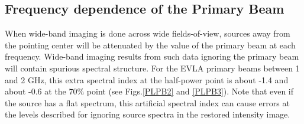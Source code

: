 \documentclass[structabstract]{stylefiles/aa}
\begin{document}
\subsection{Frequency dependence of the Primary Beam}

When wide-band imaging is done across wide fields-of-view, sources away from the
pointing center will be attenuated by the value of the primary beam at each
frequency. Wide-band imaging results from such data ignoring the primary beam
will contain spurious spectral structure.
For the EVLA primary beams between 1 and 2 GHz, this extra spectral index at the
half-power point is about -1.4 and about -0.6 at the 70\% point
(see Figs.\ref{PLPB2} and \ref{PLPB3}).
Note that even if the source has a flat spectrum, this artificial spectral index
can cause errors at the levels described for ignoring source spectra in the
restored intensity image.

%




\end{document}
